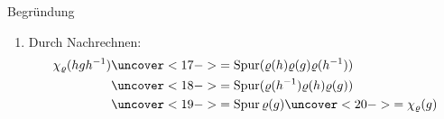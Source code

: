 \begin{frame}[t]
\begin{columns}[t,onlytextwidth]
\begin{column}{0.52\textwidth}
{\begin{block}{Begründung}
\begin{enumerate}
\begin{align*}
{\chi_{\varrho}(g)}
\end{align*}
\item<16->
Durch Nachrechnen:
\begin{align*}
\chi_{\varrho}(hgh^{-1})
&\uncover<17->{=
\operatorname{Spur}
(
\varrho(h)
\varrho(g)
\varrho(h^{-1})
)}
\\
&\uncover<18->{=
\operatorname{Spur}
(
\varrho(h^{-1})
\varrho(h)
\varrho(g)
)}
\\
&\uncover<19->{=
\operatorname{Spur}\varrho(g)}
\uncover<20->{=
\chi_{\varrho}(g)}
\end{align*}
\end{enumerate}
\end{block}}
\end{column}
\end{columns}
\end{frame}
\egroup
